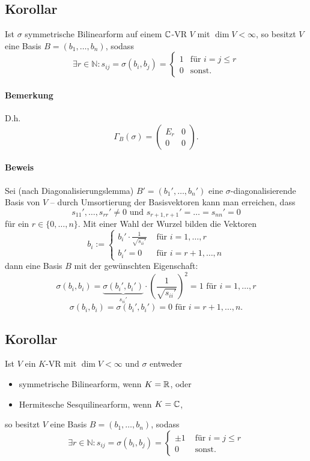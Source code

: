 \subsection{Korollar}
\begin{Korollar}[]\label{silkor1}
	Ist $ \sigma $ symmetrische Bilinearform auf einem $ \mathbb{C} $-VR $ V $ mit $ \dim V < \infty $, so besitzt $ V $ eine Basis $ B = (b_1,\dots,b_n) $, sodass
		\[ \exists r\in \mathbb{N}: s_{ij} = \sigma(b_i,b_j) = \begin{cases}
		1 & \text{für } i = j \leq r\\
		0 & \text{sonst}.
		\end{cases} \]
\end{Korollar}

\paragraph{Bemerkung}
	D.h.
		\[ \Gamma_B(\sigma) = \begin{pmatrix}
		E_r & 0 \\ 0 & 0
		\end{pmatrix}. \]
\paragraph{Beweis}
	Sei (nach Diagonalisierungslemma) $ B' = (b_1',\dots,b_n') $ eine $ \sigma$-diagonalisierende Basis von $ V $ -- durch Umsortierung der Basisvektoren kann man erreichen, dass
		\[ s_{11}' ,\dots, s_{rr}' \neq 0 \text{ und } s_{r+1,r+1}' = \dots = s_{nn}' = 0 \]
	für ein $ r\in \{0,\dots,n\} $. Mit einer Wahl der Wurzel bilden die Vektoren 
		\[ b_i := \begin{cases}
		{b_i'}\cdot \frac{1}{\sqrt{s_{ii}'}} & \text{ für } i = 1,\dots,r\\
		b_i' = 0 & \text{ für } i = r+1,\dots,n 
		\end{cases} \]
	dann eine Basis $ B $ mit der gewünschten Eigenschaft:
		\[ \sigma(b_i,b_i) = \underset{s_{ii}'}{\underbrace{\sigma(b_i',b_i')}} \cdot \left(\frac{1}{\sqrt{s_{ii}'}}\right)^2 = 1 \text{ für } i = 1,\dots,r\]
		\[ \sigma(b_i,b_i) = \sigma(b_i',b_i') = 0 \text{ für } i = r+1,\dots, n. \]
		
\subsection{Korollar}
\begin{Korollar}[]\label{silkor2}
	Ist $ V $ ein $ K $-VR mit $ \dim V <\infty $ und $ \sigma $ entweder
		\begin{itemize}
			\item symmetrische Bilinearform, wenn $ K=\mathbb{R} $, oder
			\item Hermitesche Sesquilinearform, wenn $ K = \mathbb{C} $,
		\end{itemize}
	so besitzt $ V $ eine Basis $ B = (b_1,\dots,b_n) $, sodass
		\[ \exists r\in \mathbb{N}: s_{ij} = \sigma(b_i,b_j) =
		\begin{cases}
			\pm 1 & \text{ für }i = j \leq r\\
			0 & \text{ sonst.}
		\end{cases} \]
\end{Korollar}
